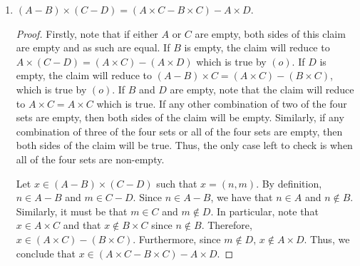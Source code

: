 \documentclass[12pt]{article}
\begin{document}
\begin{enumerate}[label=(\alph*)]
\begin{proof}
		Let $y \in (A \times B) - (A \times C)$ such that $y = (n. m)$. 
		By definition, $y \in A \times B$ and $y \notin A \times C$.
		Since $y \in A \times B$, $n \in A$ and $m \in B$. Furthermore,
		since $y \notin A \times C$, either $n \notin A$, $m \notin C$, or both are 
		not in the corresponding set. Since $n \in A$, it must be that $m \notin C$.
		Thus, not that $m \in B$ and $m \notin C$, which implies that $m \in B - C$.
		Therefore, we have that $y \in A \times (B - C)$. As such, we conclude that
		$(A \times B) - (A \times C) \subseteq A \times (B - C)$. Hence, we have shown 
		that $A \times (B - C) = (A \times B) - (A \times C)$.
	\end{proof}
	\item $(A - B) \times (C - D) = (A \times C - B \times C) - A \times D$.
	\begin{proof}
		Firstly, note that if either $A$ or $C$ are empty, both sides of this claim are 
		empty and as such are equal. If $B$ is empty, the claim will reduce to 
		$A \times (C - D) = (A \times C) - (A \times D)$ which is true by $(o)$. 
		If $D$ is empty, the claim will reduce to $(A - B) \times C = (A \times C)
		- (B \times C)$, which is true by $(o)$. If $B$ and $D$ are empty,
		note that the claim will reduce to $A \times C = A \times C$ which is true.
		If any other combination of two of the four sets are empty, then both sides
		of the claim will be empty. Similarly, if any combination of three of the four
		sets or all of the four sets are empty, then both sides of the claim will be true.
		Thus, the only case left to check is when all of the four sets are non-empty.
		
		Let $x \in (A - B) \times (C - D)$ such that $x = (n, m)$. By definition,
		$n \in A - B$ and $m \in C - D$. Since $n \in A - B$, we have that 
		$n \in A$ and $n \notin B$. Similarly, it must be that $m \in C$ and $m \notin D$.
		In particular, note that $x \in A \times C$ and that $x \notin B \times C$
		since $n \notin B$. Therefore, $x \in (A \times C) - (B \times C)$. Furthermore,
		since $m \notin D$, $x \notin A \times D$. Thus, we conclude that 
		$x \in (A \times C - B \times C) - A \times D$.
		

\end{proof}
\end{enumerate}
\end{document}
